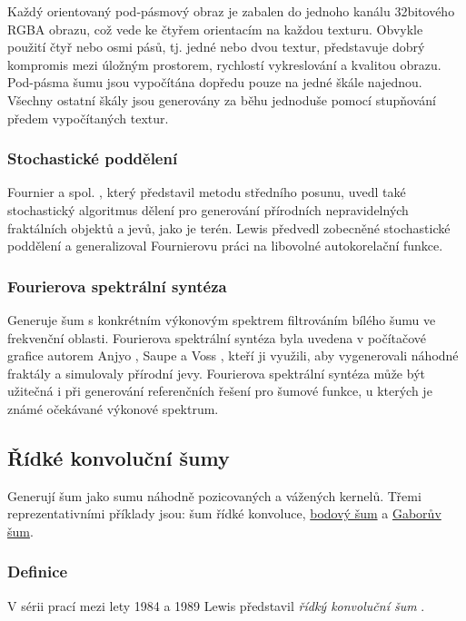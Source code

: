 Každý orientovaný pod-pásmový obraz je zabalen do jednoho kanálu 32bitového RGBA obrazu, což vede ke čtyřem orientacím na každou texturu. Obvykle použití čtyř nebo osmi pásů, tj. jedné nebo dvou textur, představuje dobrý kompromis mezi úložným prostorem, rychlostí vykreslování a kvalitou obrazu. Pod-pásma šumu jsou vypočítána dopředu pouze na jedné škále najednou. Všechny ostatní škály jsou generovány za běhu jednoduše pomocí stupňování předem vypočítaných textur. \cite{Lagae10}

\subsubsection{Stochastické poddělení}
Fournier a spol. \cite{Fournier98}, který představil metodu středního posunu, uvedl také stochastický algoritmus dělení pro generování přírodních nepravidelných fraktálních objektů a jevů, jako je terén. Lewis \cite{Lewis86,Lewis87} předvedl zobecněné stochastické poddělení a generalizoval Fournierovu práci na libovolné autokorelační funkce.

\subsubsection{Fourierova spektrální syntéza}
\label{Fourier}
Generuje šum s konkrétním výkonovým spektrem filtrováním bílého šumu ve frekvenční oblasti. Fourierova spektrální syntéza byla uvedena v počítačové grafice autorem Anjyo \cite{Anjyo88}, Saupe a Voss \cite{Saupe1988}, kteří ji využili, aby vygenerovali náhodné fraktály a simulovaly přírodní jevy. Fourierova spektrální syntéza může být užitečná i při generování referenčních řešení pro šumové funkce, u kterých je známé očekávané výkonové spektrum.

\subsection{Řídké konvoluční šumy}
\label{SparseNoises}
Generují šum jako sumu náhodně pozicovaných a vážených kernelů. Třemi reprezentativními příklady jsou: šum řídké konvoluce, \hyperref[SpotNoise]{bodový šum} a \hyperref[GaborNoise]{Gaborův šum}.

\subsubsection{Definice}
V sérii prací mezi lety 1984 a 1989 Lewis představil \textit{řídký konvoluční šum} \cite{Lewis84, Lewis86, Lewis89}.

